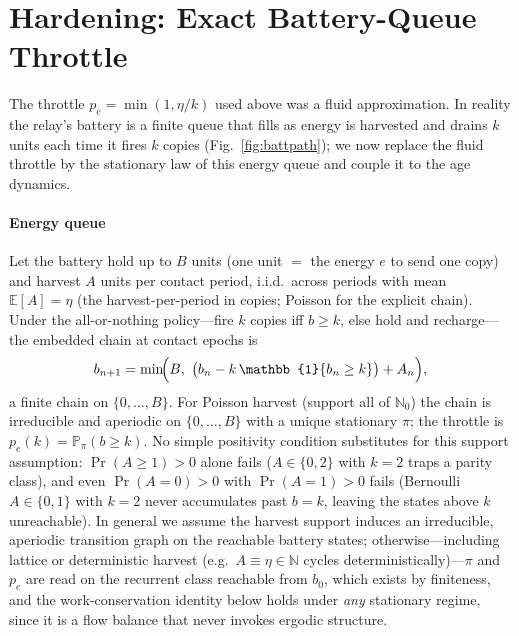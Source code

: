 \documentclass[twocolumn,3p,times,procedia]{elsarticle}
\newcommand{\E}{\mathbb{E}}
\newcommand{\Prob}{\mathbb{P}}
\newcommand{\ind}{\mathbb{1}}
\newcommand{\peff}{p_e}
\begin{document}
\section{Hardening: Exact Battery-Queue Throttle}\label{sec:r3hard}
The throttle $\peff=\min(1,\eta/k)$ used above was a fluid approximation.
In reality the relay's battery is a finite queue that fills as energy is
harvested and drains $k$ units each time it fires $k$ copies
(Fig.~\ref{fig:battpath}); we now
replace the fluid throttle by the stationary law of this energy queue and
couple it to the age dynamics.

\paragraph*{Energy queue}
Let the battery hold up to $B$ units (one unit $=$ the energy $e$ to send
one copy) and harvest $A$ units per contact period, i.i.d.\ across periods
with mean $\E[A]=\eta$ (the harvest-per-period in copies; Poisson for the
explicit chain). Under the all-or-nothing policy---fire
$k$ copies iff $b\ge k$, else hold and recharge---the embedded chain at
contact epochs is
\begin{equation}
b_{n+1}=\min\!\Bigl(B,\ \bigl(b_n-k\,\ind\{b_n\ge k\}\bigr)+A_n\Bigr),
\end{equation}
a finite chain on $\{0,\dots,B\}$. For Poisson harvest (support all of
$\mathbb{N}_0$) the chain is irreducible and aperiodic on
$\{0,\dots,B\}$ with a unique stationary $\pi$; the throttle is
$\peff(k)=\Prob_\pi(b\ge k)$. No simple positivity condition
substitutes for this support assumption: $\Pr(A{\ge}1)>0$ alone fails
($A\in\{0,2\}$ with $k{=}2$ traps a parity class), and even
$\Pr(A{=}0)>0$ with $\Pr(A{=}1)>0$ fails (Bernoulli $A\in\{0,1\}$ with
$k{=}2$ never accumulates past $b{=}k$, leaving the states above $k$
unreachable). In general we assume the harvest support induces an
irreducible, aperiodic transition graph on the reachable battery
states; otherwise---including lattice or deterministic harvest (e.g.\
$A\equiv\eta\in\mathbb{N}$ cycles deterministically)---$\pi$ and
$\peff$ are read on the recurrent class reachable from $b_0$, which
exists by finiteness, and the work-conservation
identity below holds under \emph{any} stationary regime, since it is a
flow balance that never invokes ergodic structure.
\end{document}
